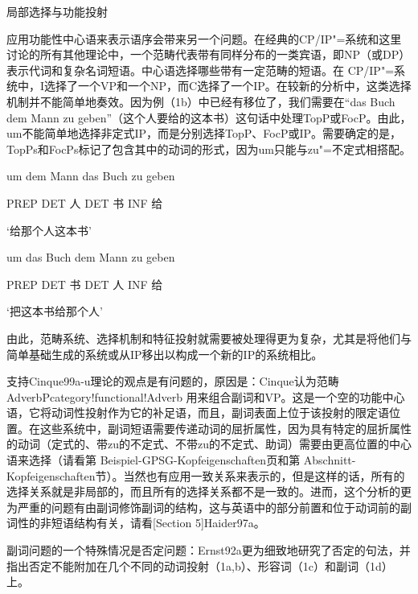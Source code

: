 局部选择与功能投射


应用功能性中心语来表示语序会带来另一个问题。在经典的CP/IP"=系统和这里讨论的所有其他理论中，一个范畴代表带有同样分布的一类宾语，即NP（或DP）表示代词和复杂名词短语。中心语选择哪些带有一定范畴的短语。在 CP/IP"=系统中，I选择了一个VP和一个NP，而C选择了一个IP。在较新的分析中，这类选择机制并不能简单地奏效。因为例（1b）中已经有移位了，我们需要在“das Buch dem Mann zu geben”（这个人要给的这本书）这句话中处理TopP或FocP。由此，um不能简单地选择非定式IP，而是分别选择TopP、FocP或IP。需要确定的是，TopPs和FocPs标记了包含其中的动词的形式，因为um只能与zu"=不定式相搭配。













um dem Mann das Buch zu geben

     PREP DET 人 DET 书 INF 给

`给那个人这本书'



um das Buch dem Mann zu geben

     PREP DET 书 DET 人 INF 给

`把这本书给那个人'



由此，范畴系统、选择机制和特征投射就需要被处理得更为复杂，尤其是将他们与简单基础生成的系统或从IP移出以构成一个新的IP的系统相比。




支持Cinque99a-u理论的观点是有问题的，原因是：Cinque认为范畴AdverbPcategory!functional!Adverb 用来组合副词和VP。这是一个空的功能中心语，它将动词性投射作为它的补足语，而且，副词表面上位于该投射的限定语位置。在这些系统中，副词短语需要传递动词的屈折属性，因为具有特定的屈折属性的动词（定式的、带zu的不定式、不带zu的不定式、助词）需要由更高位置的中心语来选择（请看第 Beispiel-GPSG-Kopfeigenschaften页和第 Abschnitt-Kopfeigenschaften节）。当然也有应用一致关系来表示的，但是这样的话，所有的选择关系就是非局部的，而且所有的选择关系都不是一致的。进而，这个分析的更为严重的问题有由副词修饰副词的结构，这与英语中的部分前置和位于动词前的副词性的非短语结构有关，请看[Section 5]Haider97a。










副词问题的一个特殊情况是否定问题：Ernst92a更为细致地研究了否定的句法，并指出否定不能附加在几个不同的动词投射（1a,b）、形容词（1c）和副词（1d）上。






